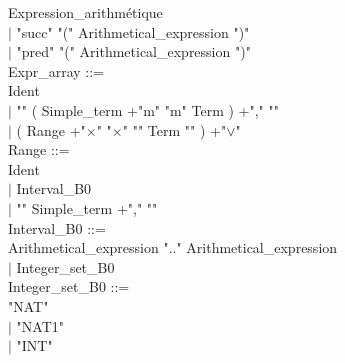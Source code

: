\documentclass[12pt,a4paper,draft]{article}
\begin{document}
{\begin{sloppypar}
Expression\_arithmétique\\
\hspace*{0.20in} $|$ "succ" "(" Arithmetical\_expression ")"\\
\hspace*{0.20in} $|$ "pred" "(" Arithmetical\_expression ")" \\
Expr\_array ::= \\
\hspace*{0.20in}  Ident \\
\hspace*{0.20in} $|$ "{" ( Simple\_term +"m"  "m" Term ) +","  "}" \\
\hspace*{0.20in} $|$ ( Range +"$\times$" "$\times$"  "{" Term "}" ) +"$\lor$"\\
Range ::= \\
\hspace*{0.20in}  Ident \\
\hspace*{0.20in} $|$  Interval\_B0\\
\hspace*{0.20in} $|$ "{" Simple\_term +","  "}" \\
Interval\_B0 ::= \\
\hspace*{0.20in}  Arithmetical\_expression  ".."  Arithmetical\_expression \\
\hspace*{0.20in} $|$  Integer\_set\_B0\\
Integer\_set\_B0 ::= \\
\hspace*{0.20in}  "NAT"\\
\hspace*{0.20in} $|$ "NAT1"\\
\hspace*{0.20in} $|$ "INT" \\

\end{sloppypar} 
}
\end{document}
